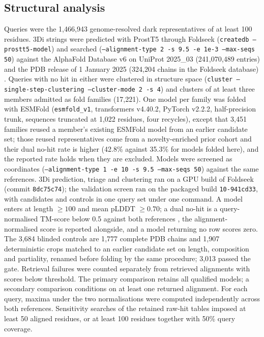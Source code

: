 \documentclass[11pt]{article}
\begin{document}
\subsection*{Structural analysis}
Queries were the 1{,}466{,}943 genome-resolved dark representatives of at least 100 residues. 3Di
strings were predicted with ProstT5 \citep{heinzinger2024prostt5} through Foldseek
\citep{vankempen2024foldseek} (\texttt{createdb --prostt5-model}) and searched
(\texttt{--alignment-type 2 -s 9.5 -e 1e-3 --max-seqs 50}) against the AlphaFold Database v6 on
UniProt 2025\_03 (241{,}070{,}489 entries) \citep{varadi2024alphafolddb} and the PDB release of 1
January 2025 (324{,}204 chains in the Foldseek database) \citep{berman2000pdb}. Queries with no hit
in either were clustered in structure space (\texttt{cluster --single-step-clustering --cluster-mode
2 -s 4}) and clusters of at least three members admitted as fold families (17{,}221). One model per
family was folded with ESMFold \citep{lin2023esmfold} (\texttt{esmfold\_v1}, transformers v4.40.2,
PyTorch v2.2.2, half-precision trunk, sequences truncated at 1{,}022 residues, four recycles), except
that 3{,}451 families reused a member's existing ESMFold model from an earlier candidate set; those
reused representatives come from a novelty-enriched prior cohort and their dual no-hit rate is higher
(42.8\% against 35.3\% for models folded here), and the reported rate holds when they are excluded.
Models were screened as coordinates (\texttt{--alignment-type 1 -e 10 -s 9.5 --max-seqs 50})
against the same references. 3Di prediction, triage and clustering ran on a GPU build of Foldseek
(commit \texttt{8dc75c74}); the validation screen ran on the packaged build \texttt{10-941cd33},
with candidates and controls in one query set under one command. A model enters at length
$\geq 100$ and mean pLDDT $\geq 0.70$; a dual no-hit is a query-normalised TM-score below 0.5 against
both references \citep{zhang2004tmscore}, the alignment-normalised score is reported alongside, and a
model returning no row scores zero. The 3{,}684 blinded controls are 1{,}777 complete PDB chains and
1{,}907 deterministic crops matched to an earlier candidate set on length, composition and
partiality, renamed before folding by the same procedure; 3{,}013 passed the gate. Retrieval failures were counted separately from retrieved alignments with scores below threshold.
The primary comparison retains all qualified models; a secondary comparison conditions on at least
one returned alignment. For each query, maxima under the two normalisations were computed
independently across both references. Sensitivity searches of the retained raw-hit tables imposed
at least 50 aligned residues, or at least 100 residues together with 50\% query coverage.
\end{document}
